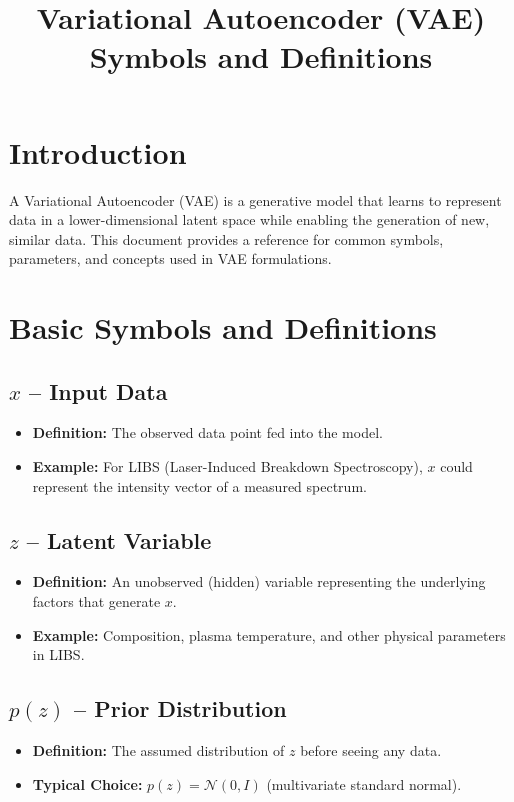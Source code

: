 \documentclass[12pt,a4paper]{article}
\title{Variational Autoencoder (VAE) Symbols and Definitions}
\author{}
\date{}
\begin{document}
	
	\maketitle
	
	\section{Introduction}
	A Variational Autoencoder (VAE) is a generative model that learns to represent data in a lower-dimensional latent space while enabling the generation of new, similar data. This document provides a reference for common symbols, parameters, and concepts used in VAE formulations.
	
	\section{Basic Symbols and Definitions}
	
	\subsection{\( x \) -- Input Data}
	\begin{itemize}
		\item \textbf{Definition:} The observed data point fed into the model.
		\item \textbf{Example:} For LIBS (Laser-Induced Breakdown Spectroscopy), \( x \) could represent the intensity vector of a measured spectrum.
	\end{itemize}
	
	\subsection{\( z \) -- Latent Variable}
	\begin{itemize}
		\item \textbf{Definition:} An unobserved (hidden) variable representing the underlying factors that generate \( x \).
		\item \textbf{Example:} Composition, plasma temperature, and other physical parameters in LIBS.
	\end{itemize}
	
	\subsection{\( p(z) \) -- Prior Distribution}
	\begin{itemize}
		\item \textbf{Definition:} The assumed distribution of \( z \) before seeing any data.
		\item \textbf{Typical Choice:} \( p(z) = \mathcal{N}(0, I) \) (multivariate standard normal).
	\end{itemize}
	
\end{document}
